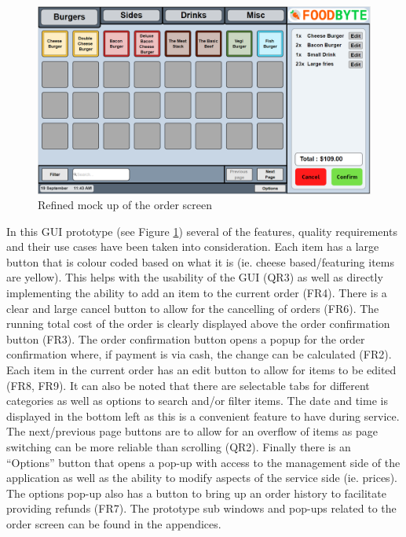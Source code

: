 \begin{figure}[ht]
	\centering
	\includegraphics[width=150mm]{images/GUI_prototypes/Order_screen.PNG}
	\caption{Refined mock up of the order screen}
	\label{fig:order_screen_moqueup}
\end{figure}

In this GUI prototype (see Figure \ref{fig:order_screen_moqueup}) several of the features, quality requirements and their use cases have been taken into consideration. Each item has a large button that is colour coded based on what it is (ie. cheese based/featuring items are yellow). This helps with the usability of the GUI (QR3) as well as directly implementing the ability to add an item to the current order (FR4). There is a clear and large cancel button to allow for the cancelling of orders (FR6). The running total cost of the order is clearly displayed above the order confirmation button (FR3). The order confirmation button opens a popup for the order confirmation where, if payment is via cash, the change can be calculated (FR2). Each item in the current order has an edit button to allow for items to be edited (FR8, FR9). It can also be noted that there are selectable tabs for different categories as well as options to search and/or filter items. The date and time is displayed in the bottom left as this is a convenient feature to have during service. The next/previous page buttons are to allow for an overflow of items as page switching can be more reliable than scrolling (QR2). Finally there is an “Options” button that opens a pop-up with access to the management side of the application as well as the ability to modify aspects of the service side (ie. prices). The options pop-up also has a button to bring up an order history to facilitate providing refunds (FR7).
The prototype sub windows and pop-ups related to the order screen can be found in the appendices.

